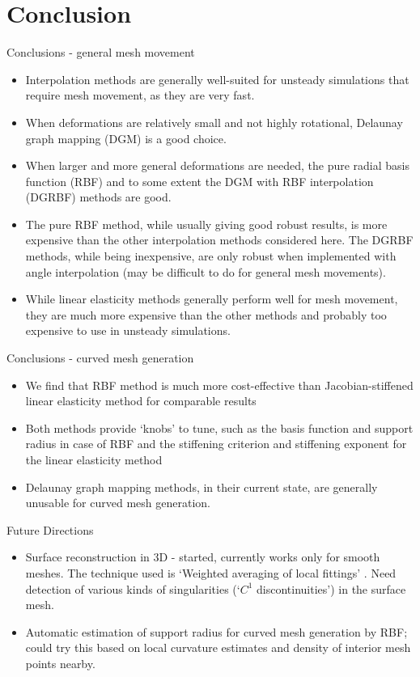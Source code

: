 \documentclass[t,12pt]{beamer}
\begin{document}
\section{Conclusion}
\begin{frame}[allowframebreaks]{Conclusions - general mesh movement}
\begin{itemize}
\item Interpolation methods are generally well-suited for unsteady simulations that require mesh movement, as they are very fast.
\item When deformations are relatively small and not highly rotational, Delaunay graph mapping (DGM) is a good choice.
\item When larger and more general deformations are needed, the pure radial basis function (RBF) and to some extent the DGM with RBF interpolation (DGRBF) methods are good. 
\item The pure RBF method, while usually giving good robust results, is more expensive than the other interpolation methods considered here. The DGRBF methods, while being inexpensive, are only robust when implemented with angle interpolation (may be difficult to do for general mesh movements).
\item While linear elasticity methods generally perform well for mesh movement, they are much more expensive than the other methods and probably too expensive to use in unsteady simulations.
\end{itemize}
\end{frame}
\begin{frame}{Conclusions - curved mesh generation}
\begin{itemize}
	\item We find that RBF method is much more cost-effective than Jacobian-stiffened linear elasticity method for comparable results
	\item Both methods provide `knobs' to tune, such as the basis function and support radius in case of RBF and the stiffening criterion and stiffening exponent for the linear elasticity method
	\item Delaunay graph mapping methods, in their current state, are generally unusable for curved mesh generation.
\end{itemize}
\end{frame}
\begin{frame}{Future Directions}
\begin{itemize}
	\item Surface reconstruction in 3D - started, currently works only for smooth meshes. The technique used is `Weighted averaging of local fittings' . 
	Need detection of various kinds of singularities (`$C^1$ discontinuities') in the surface mesh.
	\item Automatic estimation of support radius for curved mesh generation by RBF; could try this based on local curvature estimates and density of interior mesh points nearby.
\end{itemize}
\end{frame}
\end{document}
